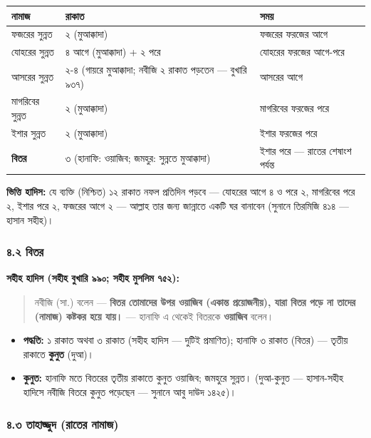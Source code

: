 \begin{table}[h]\centering\small
\begin{tabular}{lll}
নামাজ & রাকাত & সময় \\
\hline
ফজরের সুন্নত & ২ (মুআক্কাদা) & ফজরের ফরজের আগে \\
যোহরের সুন্নত & ৪ আগে (মুআক্কাদা) + ২ পরে & যোহরের ফরজের আগে-পরে \\
আসরের সুন্নত & ২-৪ (গায়রে মুআক্কাদা; নবীজি ২ রাকাত পড়তেন — বুখারি ৯৩৭) & আসরের আগে \\
মাগরিবের সুন্নত & ২ (মুআক্কাদা) & মাগরিবের ফরজের পরে \\
ইশার সুন্নত & ২ (মুআক্কাদা) & ইশার ফরজের পরে \\
\textbf{বিতর} & ৩ (হানাফি: ওয়াজিব; জমহুর: সুন্নতে মুআক্কাদা) & ইশার পরে — রাতের শেষাংশ পর্যন্ত \\
\hline
\end{tabular}
\end{table}

\textbf{ভিত্তি হাদিস:} যে ব্যক্তি (নিশ্চিত) ১২ রাকাত নফল প্রতিদিন পড়বে — যোহরের আগে ৪ ও পরে ২, মাগরিবের পরে ২, ইশার পরে ২, ফজরের আগে ২ — আল্লাহ তার জন্য জান্নাতে একটি ঘর বানাবেন (সুনানে তিরমিজি ৪১৪ — হাসান সহীহ)।

\subsubsection*{৪.২ বিতর}

\textbf{সহীহ হাদিস (সহীহ বুখারি ৯৯০; সহীহ মুসলিম ৭৫২):}

\begin{quote}
নবীজি (সা.) বলেন — \textbf{বিতর তোমাদের উপর ওয়াজিব (একান্ত প্রয়োজনীয়), যারা বিতর পড়ে না তাদের (নামাজ) কষ্টকর হয়ে যায়।} — হানাফি এ থেকেই বিতরকে \textbf{ওয়াজিব} বলেন।
\end{quote}

\begin{itemize}
\item \textbf{পদ্ধতি:} ১ রাকাত অথবা ৩ রাকাত (সহীহ হাদিস — দুটিই প্রমাণিত); হানাফি ৩ রাকাত (বিতর) — তৃতীয় রাকাতে \textbf{কুনুত} (দুআ)।
\item \textbf{কুনুত:} হানাফি মতে বিতরের তৃতীয় রাকাতে কুনুত ওয়াজিব; জমহুরে সুন্নত। (দুআ-কুনুত — হাসান-সহীহ হাদিসে নবীজি বিতরে কুনুত পড়েছেন — সুনানে আবু দাউদ ১৪২৫)।
\end{itemize}
\subsubsection*{৪.৩ তাহাজ্জুদ (রাতের নামাজ)}

